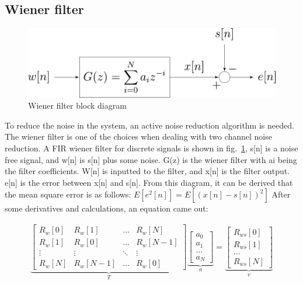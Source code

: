 \subsection{Wiener filter}

\begin{figure}[H]
\centerline{\includegraphics[scale=0.5]{3-literature/Wiener_block.pdf}}
\caption{Wiener filter block diagram}
\label{fig_Wiener_block}
\end{figure}

To reduce the noise in the system, an active noise reduction algorithm is needed.  The wiener filter is one of the choices when dealing with two channel noise reduction.  A FIR wiener filter for discrete signals \cite{WienerPaper} is shown in fig.~\ref{fig_Wiener_block}, s[n] is a noise free signal, and w[n] is s[n] plus some noise.  G(z) is the wiener filter with ai being the filter coefficients.   W[n] is inputted to the filter, and x[n] is the filter output.  e[n] is the error between x[n] and s[n].  From this diagram, it can be derived that the mean square error is as follows:
$E[e^2 [n]]=E[(x[n]-s[n])^2 ]$
After some derivatives and calculations, an equation came out:


\begin{gather} \label{eqn_WienerMatrix}
\underbrace{
    \begin{bmatrix}
    R_w[0] & R_w[1] & \dots & R_w[N] \\
    R_w[1] & R_w[0] & \dots & R_w[N-1] \\
    \vdots & \vdots & \ddots & \vdots \\
    R_w[N] & R_w[N-1] & \dots & R_w[0]
    \end{bmatrix}
}_{T}
\underbrace{
    \begin{bmatrix}
    a_0 \\
    a_1 \\
    \dots \\
    a_N
    \end{bmatrix}
}_{a}
=
\underbrace{
    \begin{bmatrix}
    R_{ws}[0] \\
    R_{ws}[1] \\
    \dots \\
    R_{ws}[N]
    \end{bmatrix}
}_{v}
\end{gather}

